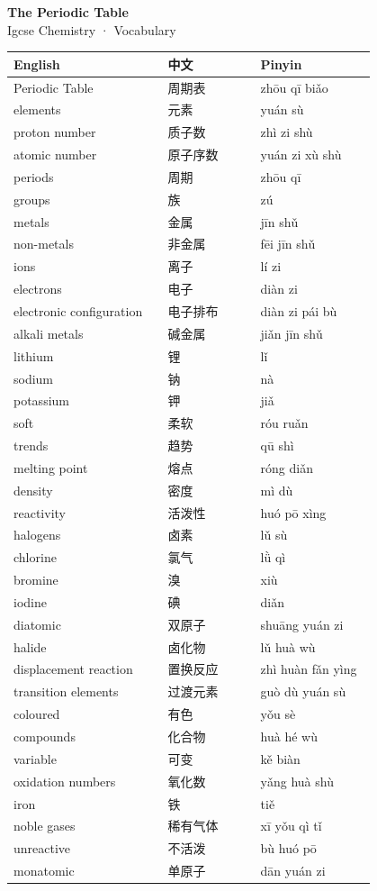 \documentclass[11pt]{article}
\begin{document}
\begin{center}
  {\LARGE\bfseries The Periodic Table}\\[0.35em]
  {\large Igcse Chemistry · Vocabulary}
\end{center}
\vspace{0.6em}

\begin{longtable}{@{}p{0.40\linewidth}p{0.24\linewidth}p{0.30\linewidth}@{}}
\toprule
\textbf{English} & \textbf{中文} & \textbf{Pinyin} \\
\midrule
\endhead
\bottomrule
\endlastfoot
Periodic Table & 周期表 & zhōu qī biǎo \\
elements & 元素 & yuán sù \\
proton number & 质子数 & zhì zi shù \\
atomic number & 原子序数 & yuán zi xù shù \\
periods & 周期 & zhōu qī \\
groups & 族 & zú \\
metals & 金属 & jīn shǔ \\
non-metals & 非金属 & fēi jīn shǔ \\
ions & 离子 & lí zi \\
electrons & 电子 & diàn zi \\
electronic configuration & 电子排布 & diàn zi pái bù \\
alkali metals & 碱金属 & jiǎn jīn shǔ \\
lithium & 锂 & lǐ \\
sodium & 钠 & nà \\
potassium & 钾 & jiǎ \\
soft & 柔软 & róu ruǎn \\
trends & 趋势 & qū shì \\
melting point & 熔点 & róng diǎn \\
density & 密度 & mì dù \\
reactivity & 活泼性 & huó pō xìng \\
halogens & 卤素 & lǔ sù \\
chlorine & 氯气 & lǜ qì \\
bromine & 溴 & xiù \\
iodine & 碘 & diǎn \\
diatomic & 双原子 & shuāng yuán zi \\
halide & 卤化物 & lǔ huà wù \\
displacement reaction & 置换反应 & zhì huàn fǎn yìng \\
transition elements & 过渡元素 & guò dù yuán sù \\
coloured & 有色 & yǒu sè \\
compounds & 化合物 & huà hé wù \\
variable & 可变 & kě biàn \\
oxidation numbers & 氧化数 & yǎng huà shù \\
iron & 铁 & tiě \\
noble gases & 稀有气体 & xī yǒu qì tǐ \\
unreactive & 不活泼 & bù huó pō \\
monatomic & 单原子 & dān yuán zi \\
\end{longtable}
\end{document}

